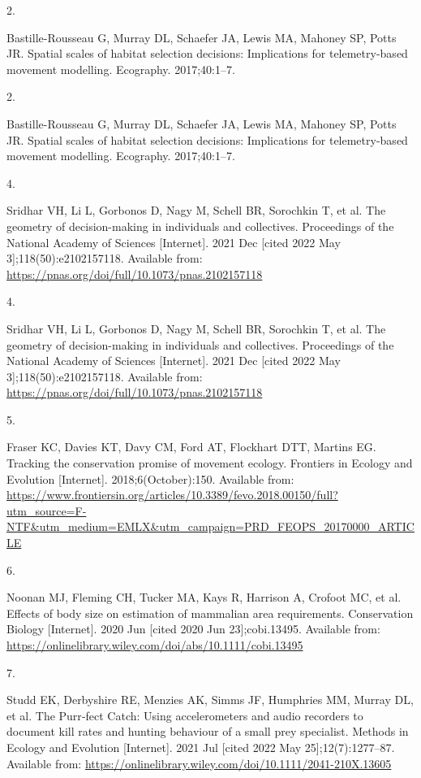 \documentclass[10pt,a4paper]{article}
\newlength{\cslhangindent}
\newlength{\csllabelwidth}
\newlength{\cslentryspacingunit} %
\newenvironment{CSLReferences}[2] %
 {%
  \setlength{\parindent}{0pt}
  \ifodd #1
  \let\oldpar\par
  \def\par{\hangindent=\cslhangindent\oldpar}
  \fi
  \setlength{\parskip}{#2\cslentryspacingunit}
 }%
 {}
\newcommand{\CSLLeftMargin}[1]{\parbox[t]{\csllabelwidth}{#1}}
\newcommand{\CSLRightInline}[1]{\parbox[t]{\linewidth - \csllabelwidth}{#1}\break}
\begin{document}
\hypertarget{refs}{}
\begin{CSLReferences}{0}{0}
\leavevmode\hypertarget{ref-Bastille-Rousseau2017}{}%
\CSLLeftMargin{2. }
\CSLRightInline{Bastille-Rousseau G, Murray DL, Schaefer JA, Lewis MA, Mahoney SP, Potts JR. Spatial scales of habitat selection decisions: {Implications} for telemetry-based movement modelling. Ecography. 2017;40:1--7. }

\leavevmode\hypertarget{ref-Bastille-Rousseau2017}{}%
\CSLLeftMargin{2. }
\CSLRightInline{Bastille-Rousseau G, Murray DL, Schaefer JA, Lewis MA, Mahoney SP, Potts JR. Spatial scales of habitat selection decisions: {Implications} for telemetry-based movement modelling. Ecography. 2017;40:1--7. }

\leavevmode\hypertarget{ref-sridhar_geometry_2021}{}%
\CSLLeftMargin{4. }
\CSLRightInline{Sridhar VH, Li L, Gorbonos D, Nagy M, Schell BR, Sorochkin T, et al. The geometry of decision-making in individuals and collectives. Proceedings of the National Academy of Sciences {[}Internet{]}. 2021 Dec {[}cited 2022 May 3{]};118(50):e2102157118. Available from: \url{https://pnas.org/doi/full/10.1073/pnas.2102157118}}

\leavevmode\hypertarget{ref-sridhar_geometry_2021}{}%
\CSLLeftMargin{4. }
\CSLRightInline{Sridhar VH, Li L, Gorbonos D, Nagy M, Schell BR, Sorochkin T, et al. The geometry of decision-making in individuals and collectives. Proceedings of the National Academy of Sciences {[}Internet{]}. 2021 Dec {[}cited 2022 May 3{]};118(50):e2102157118. Available from: \url{https://pnas.org/doi/full/10.1073/pnas.2102157118}}

\leavevmode\hypertarget{ref-Fraser2018}{}%
\CSLLeftMargin{5. }
\CSLRightInline{Fraser KC, Davies KT, Davy CM, Ford AT, Flockhart DTT, Martins EG. Tracking the conservation promise of movement ecology. Frontiers in Ecology and Evolution {[}Internet{]}. 2018;6(October):150. Available from: \url{https://www.frontiersin.org/articles/10.3389/fevo.2018.00150/full?utm_source=F-NTF\&utm_medium=EMLX\&utm_campaign=PRD_FEOPS_20170000_ARTICLE}}

\leavevmode\hypertarget{ref-noonan_effects_2020}{}%
\CSLLeftMargin{6. }
\CSLRightInline{Noonan MJ, Fleming CH, Tucker MA, Kays R, Harrison A, Crofoot MC, et al. Effects of body size on estimation of mammalian area requirements. Conservation Biology {[}Internet{]}. 2020 Jun {[}cited 2020 Jun 23{]};cobi.13495. Available from: \url{https://onlinelibrary.wiley.com/doi/abs/10.1111/cobi.13495}}

\leavevmode\hypertarget{ref-studd_purrfect_2021}{}%
\CSLLeftMargin{7. }
\CSLRightInline{Studd EK, Derbyshire RE, Menzies AK, Simms JF, Humphries MM, Murray DL, et al. The {Purr}‐fect {Catch}: {Using} accelerometers and audio recorders to document kill rates and hunting behaviour of a small prey specialist. Methods in Ecology and Evolution {[}Internet{]}. 2021 Jul {[}cited 2022 May 25{]};12(7):1277--87. Available from: \url{https://onlinelibrary.wiley.com/doi/10.1111/2041-210X.13605}}


\end{CSLReferences}
\end{document}
